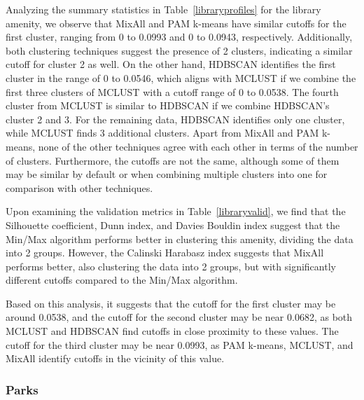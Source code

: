\documentclass[11pt, a4paper]{article}
\begin{document}
Analyzing the summary statistics in Table~\ref{libraryprofiles} for the library amenity, we observe that MixAll and PAM k-means have similar cutoffs for the first cluster, ranging from 0 to 0.0993 and 0 to 0.0943, respectively. Additionally, both clustering techniques suggest the presence of 2 clusters, indicating a similar cutoff for cluster 2 as well. On the other hand, HDBSCAN identifies the first cluster in the range of 0 to 0.0546, which aligns with MCLUST if we combine the first three clusters of MCLUST with a cutoff range of 0 to 0.0538. The fourth cluster from MCLUST is similar to HDBSCAN if we combine HDBSCAN's cluster 2 and 3. For the remaining data, HDBSCAN identifies only one cluster, while MCLUST finds 3 additional clusters. Apart from MixAll and PAM k-means, none of the other techniques agree with each other in terms of the number of clusters. Furthermore, the cutoffs are not the same, although some of them may be similar by default or when combining multiple clusters into one for comparison with other techniques.
\par
Upon examining the validation metrics in Table~\ref{libraryvalid}, we find that the Silhouette coefficient, Dunn index, and Davies Bouldin index suggest that the Min/Max algorithm performs better in clustering this amenity, dividing the data into 2 groups. However, the Calinski Harabasz index suggests that MixAll performs better, also clustering the data into 2 groups, but with significantly different cutoffs compared to the Min/Max algorithm.
\par
Based on this analysis, it suggests that the cutoff for the first cluster may be around 0.0538, and the cutoff for the second cluster may be near 0.0682, as both MCLUST and HDBSCAN find cutoffs in close proximity to these values. The cutoff for the third cluster may be near 0.0993, as PAM k-means, MCLUST, and MixAll identify cutoffs in the vicinity of this value.



\subsubsection{Parks}
\end{document}

